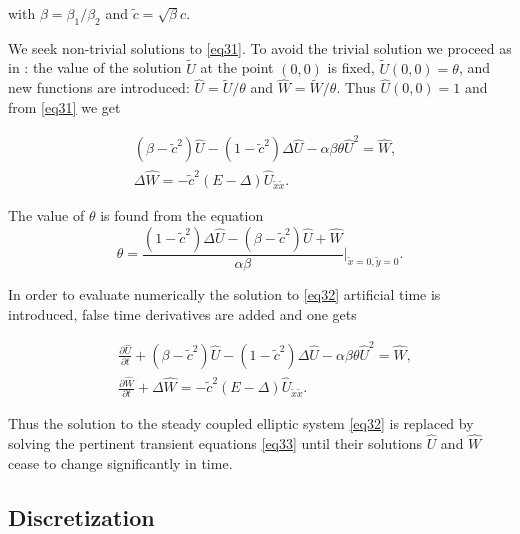 \documentclass[12pt]{article}
\theoremstyle{theorem}
\theoremstyle{defi}
\begin{document}
with $\beta = \beta_1 / \beta_2$ and $ \tilde c = \sqrt {\beta} c$.

We seek  non-trivial solutions to \eqref{eq31}. To avoid the trivial solution we proceed as in \cite{ref6}: the value of the solution $\tilde U$ at the point $(0,0)$ is fixed,  $\tilde U(0,0)=\theta $, and new  functions are introduced: $\widehat{U}=\tilde U /{\theta} $ and $\widehat{W}=\tilde W /{\theta} $. Thus  
$ \widehat{U}(0,0)=1$ and from \eqref{eq31} we get

\begin{equation}\label{eq32}
\begin{split}
& (\beta-\tilde c^2) \widehat{U}  -(1-\tilde c^2) \Delta \widehat{U} - \alpha \beta \theta \widehat{U}^2 = \widehat{W}, \\
&\Delta \widehat{W} = - \tilde c^2 (E- \Delta) \widehat{U}_{\tilde x \tilde x}.
\end{split}
\end{equation}

The value of $\theta $ is found from the  equation 
\begin{equation}\label{eqtheta}
\theta = \frac{ (1-\tilde c^2 )\Delta \widehat{U} - (\beta-\tilde c^2) \widehat{U} +\widehat{W}}{\alpha \beta} |_{\tilde x=0,\tilde y=0} .
\end{equation}

In order to evaluate numerically the solution to \eqref{eq32} artificial time is introduced, false time derivatives are added and one gets

\begin{equation}\label{eq33}
\begin{split}
&\frac {\partial \widehat{U}}{\partial t} + (\beta-\tilde c^2) \widehat{U} - (1-\tilde c^2 ) \Delta \widehat{U} - \alpha \beta \theta \widehat{U}^2 = \widehat{W}, \\
&\frac {\partial \widehat{W}}{\partial t} + \Delta \widehat{W} = - \tilde c^2 (E- \Delta) \widehat{U}_{\tilde x \tilde x}. 
\end{split}
\end{equation}

Thus the solution to the steady coupled elliptic system \eqref{eq32} is replaced by solving the pertinent transient equations \eqref{eq33} until their solutions $\widehat{U}$ and $\widehat{W}$ cease to change significantly in time. 

\subsection{Discretization}
\end{document}
